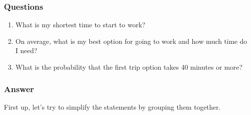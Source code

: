 \documentclass[12pt,titlepage]{article}
\begin{document}
\subsubsection*{Questions}
\begin{enumerate}
    \item What is my shortest time to start to work?
    \item On average, what is my best option for going to work and how much time do I need?
    \item What is the probability that the first trip option takes 40 minutes or more?
\end{enumerate}

\subsubsection*{Answer}
First up, let's try to simplify the statements by grouping them together.
\end{document}
